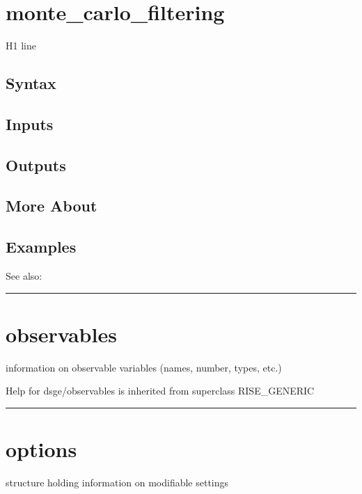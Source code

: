 \documentclass[letterpaper,10pt,english]{sphinxmanual}
\begin{document}
\section{monte\_carlo\_filtering}
\label{classes/models/@dsge/dsge:monte-carlo-filtering}\label{classes/models/@dsge/dsge:id121}
H1 line


\subsection{Syntax}
\label{classes/models/@dsge/dsge:id122}

\subsection{Inputs}
\label{classes/models/@dsge/dsge:id123}

\subsection{Outputs}
\label{classes/models/@dsge/dsge:id124}

\subsection{More About}
\label{classes/models/@dsge/dsge:id125}

\subsection{Examples}
\label{classes/models/@dsge/dsge:id126}
See also:


\bigskip\hrule{}\bigskip



\section{observables}
\label{classes/models/@dsge/dsge:id127}\label{classes/models/@dsge/dsge:observables}
information on observable variables (names, number, types, etc.)

Help for dsge/observables is inherited from superclass RISE\_GENERIC


\bigskip\hrule{}\bigskip



\section{options}
\label{classes/models/@dsge/dsge:options}\label{classes/models/@dsge/dsge:id128}
structure holding information on modifiable settings
\end{document}
